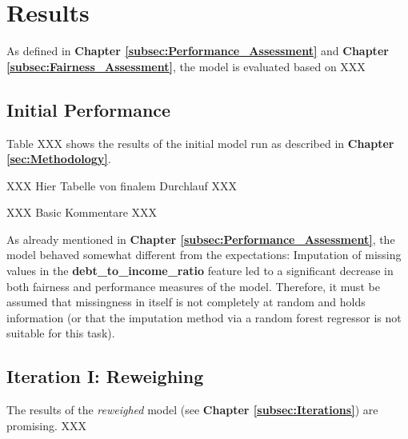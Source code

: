 \section{Results}\label{sec:Results}        

As defined in \textbf{Chapter \ref{subsec:Performance_Assessment}} and \textbf{Chapter \ref{subsec:Fairness_Assessment}}, the model is evaluated based on XXX



\subsection{Initial Performance}\label{subsec:Initial_Performance}

Table XXX shows the results of the initial model run as described in \textbf{Chapter \ref{sec:Methodology}}.

XXX Hier Tabelle von finalem Durchlauf XXX

XXX Basic Kommentare XXX

As already mentioned in \textbf{Chapter \ref{subsec:Performance_Assessment}}, the model behaved somewhat different from the expectations: Imputation of missing values in the \textbf{debt\_to\_income\_ratio} feature led to a significant decrease in both fairness and performance measures of the model.
Therefore, it must be assumed that missingness in itself is not completely at random and holds information (or that the imputation method via a random forest regressor is not suitable for this task).

\subsection{Iteration I: Reweighing}\label{subsec:Iteration_I}

The results of the \textit{reweighed} model (see \textbf{Chapter \ref{subsec:Iterations}}) are promising. XXX


